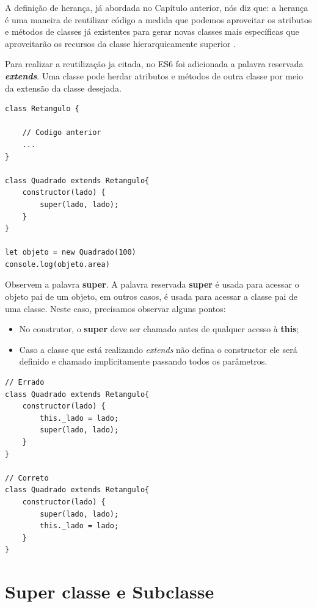 A definição de herança, já abordada no Capítulo anterior, nós diz que: a herança é uma maneira de reutilizar código a medida que podemos aproveitar os atributos e métodos de classes já existentes para gerar novas classes mais específicas que aproveitarão os recursos da classe hierarquicamente superior \cite{evandroeduardoseronruiz2008}.

Para realizar a reutilização ja citada, no ES6 foi adicionada a palavra reservada \textbf{\textit{extends}}. Uma classe pode herdar atributos e métodos de outra classe por meio da extensão da classe desejada. 

\begin{verbatim}
class Retangulo {
	
	// Codigo anterior
	...
}

class Quadrado extends Retangulo{
	constructor(lado) {
		super(lado, lado);
	}
}

let objeto = new Quadrado(100)
console.log(objeto.area)
\end{verbatim}

Observem a palavra \textbf{super}. A palavra reservada \textbf{super} é usada para acessar o objeto pai de um objeto, em outros casos, é usada para acessar a classe pai de uma classe. Neste caso, precisamos observar alguns pontos: 

\begin{itemize}
	\item No construtor, o \textbf{super} deve ser chamado antes de qualquer acesso à \textbf{this};
	\item Caso a classe que está realizando \textit{extends} não defina o constructor ele será definido e chamado implicitamente passando todos os parâmetros.
\end{itemize}

\begin{verbatim}
// Errado
class Quadrado extends Retangulo{
	constructor(lado) {
		this._lado = lado;
		super(lado, lado);
	}
}

// Correto
class Quadrado extends Retangulo{
	constructor(lado) {
		super(lado, lado);
		this._lado = lado;
	}
}
\end{verbatim}

\section{Super classe e Subclasse}

